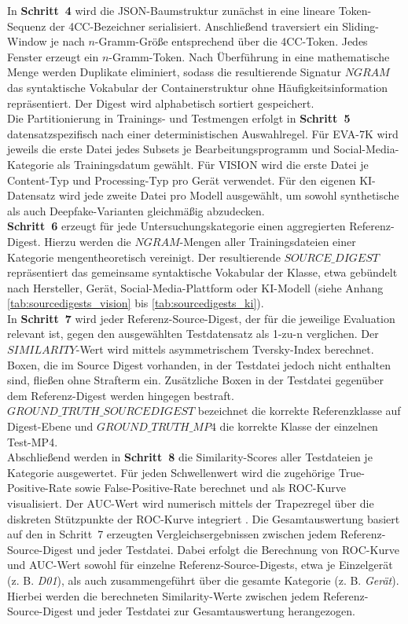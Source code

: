 In \textbf{Schritt~4} wird die JSON-Baumstruktur zunächst in eine lineare Token-Sequenz der 4CC-Bezeichner serialisiert. Anschließend traversiert ein Sliding-Window je nach \(n\)-Gramm-Größe entsprechend über die 4CC-Token. Jedes Fenster erzeugt ein \(n\)-Gramm-Token. Nach Überführung in eine mathematische Menge werden Duplikate eliminiert, sodass die resultierende Signatur \(NGRAM\) das syntaktische Vokabular der Containerstruktur ohne Häufigkeitsinformation repräsentiert. Der Digest wird alphabetisch sortiert gespeichert.\\

Die Partitionierung in Trainings- und Testmengen erfolgt in \textbf{Schritt~5} datensatzspezifisch nach einer deterministischen Auswahlregel. Für EVA-7K wird jeweils die erste Datei jedes Subsets je Bearbeitungsprogramm und Social-Media-Kategorie als Trainingsdatum gewählt. Für VISION wird die erste Datei je Content-Typ und Processing-Typ pro Gerät verwendet. Für den eigenen KI-Datensatz wird jede zweite Datei pro Modell ausgewählt, um sowohl synthetische als auch Deepfake-Varianten gleichmäßig abzudecken.\\

\textbf{Schritt~6} erzeugt für jede Untersuchungskategorie einen aggregierten Referenz-Digest. Hierzu werden die \(NGRAM\)-Mengen aller Trainingsdateien einer Kategorie mengentheoretisch vereinigt. Der resultierende \(SOURCE\_DIGEST\) repräsentiert das gemeinsame syntaktische Vokabular der Klasse, etwa gebündelt nach Hersteller, Gerät, Social-Media-Plattform oder KI-Modell (siehe Anhang \cref{tab:sourcedigests_vision} bis \ref{tab:sourcedigests_ki}).\\

In \textbf{Schritt~7} wird jeder Referenz-Source-Digest, der für die jeweilige Evaluation relevant ist, gegen den ausgewählten Testdatensatz als 1-zu-n verglichen. Der \(SIMILARITY\)-Wert wird mittels asymmetrischem Tversky-Index berechnet. Boxen, die im Source Digest vorhanden, in der Testdatei jedoch nicht enthalten sind, fließen ohne Strafterm ein. Zusätzliche Boxen in der Testdatei gegenüber dem Referenz-Digest werden hingegen bestraft. \(GROUND\_TRUTH\_SOURCEDIGEST\) bezeichnet die korrekte Referenzklasse auf Digest-Ebene und \(GROUND\_TRUTH\_MP4\) die korrekte Klasse der einzelnen Test-MP4.\\

Abschließend werden in \textbf{Schritt~8} die Similarity-Scores aller Testdateien je Kategorie ausgewertet. Für jeden Schwellenwert wird die zugehörige True-Positive-Rate sowie False-Positive-Rate berechnet und als ROC-Kurve visualisiert. Der AUC-Wert wird numerisch mittels der Trapezregel über die diskreten Stützpunkte der ROC-Kurve integriert \cite{sklearn_auc_2026}\cite{pedregosa_scikit-learn_2011}. Die Gesamtauswertung basiert auf den in Schritt~7 erzeugten Vergleichsergebnissen zwischen jedem Referenz-Source-Digest und jeder Testdatei. Dabei erfolgt die Berechnung von ROC-Kurve und AUC-Wert sowohl für einzelne Referenz-Source-Digests, etwa je Einzelgerät (z. B. \textit{D01}), als auch zusammengeführt über die gesamte Kategorie (z. B. \textit{Gerät}). Hierbei werden die berechneten Similarity-Werte zwischen jedem Referenz-Source-Digest und jeder Testdatei zur Gesamtauswertung herangezogen.